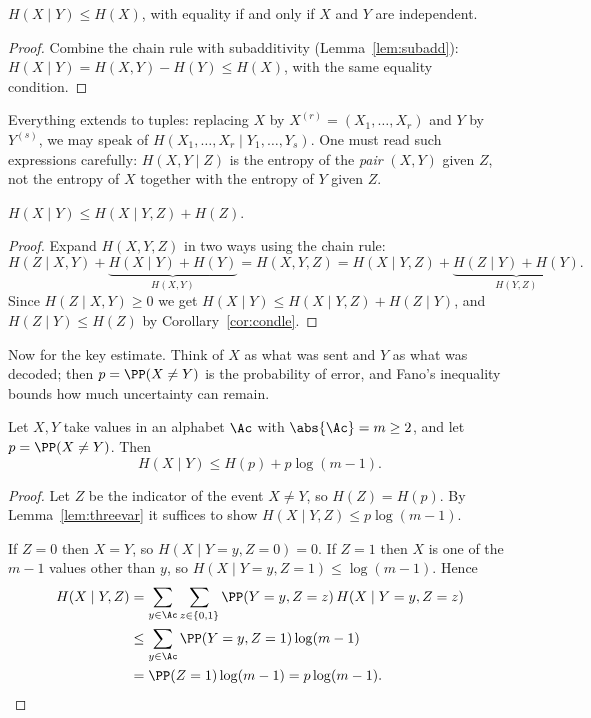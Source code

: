 \begin{corollary}\label{cor:condle}
	$H(X\mid Y)\le H(X)$, with equality if and only if $X$ and $Y$ are independent.
\end{corollary}

\begin{proof}
	Combine the chain rule with subadditivity (Lemma~\ref{lem:subadd}): $H(X\mid Y) = H(X,Y)-H(Y) \le H(X)$, with the same equality condition.
\end{proof}

Everything extends to tuples: replacing $X$ by $X^{(r)} = (X_1,\dots,X_r)$ and $Y$ by $Y^{(s)}$, we may speak of $H(X_1,\dots,X_r\mid Y_1,\dots,Y_s)$. One must read such expressions carefully: $H(X,Y\mid Z)$ is the entropy of the \emph{pair} $(X,Y)$ given $Z$, not the entropy of $X$ together with the entropy of $Y$ given $Z$.

\begin{lemma}\label{lem:threevar}
	$H(X\mid Y) \le H(X\mid Y,Z) + H(Z)$.
\end{lemma}

\begin{proof}
	Expand $H(X,Y,Z)$ in two ways using the chain rule:
	$$H(Z\mid X,Y) + \underbrace{H(X\mid Y)+H(Y)}_{H(X,Y)} = H(X,Y,Z) = H(X\mid Y,Z)+\underbrace{H(Z\mid Y)+H(Y)}_{H(Y,Z)}.$$
	Since $H(Z\mid X,Y)\ge0$ we get $H(X\mid Y) \le H(X\mid Y,Z)+H(Z\mid Y)$, and $H(Z\mid Y)\le H(Z)$ by Corollary~\ref{cor:condle}.
\end{proof}

Now for the key estimate. Think of $X$ as what was sent and $Y$ as what was decoded; then $p = \PP(X\ne Y)$ is the probability of error, and Fano's inequality bounds how much uncertainty can remain.

\begin{proposition}\label{prop:fano}
	Let $X,Y$ take values in an alphabet $\Ac$ with $\abs{\Ac} = m \ge 2$, and let $p = \PP(X\ne Y)$. Then
	$$H(X\mid Y) \le H(p) + p\log(m-1).$$
\end{proposition}

\begin{proof}
	Let $Z$ be the indicator of the event $X \ne Y$, so $H(Z) = H(p)$. By Lemma~\ref{lem:threevar} it suffices to show $H(X\mid Y,Z)\le p\log(m-1)$.

	If $Z = 0$ then $X = Y$, so $H(X\mid Y=y,Z=0) = 0$. If $Z=1$ then $X$ is one of the $m-1$ values other than $y$, so $H(X\mid Y=y,Z=1)\le\log(m-1)$. Hence
	\begin{align*}
		H(X\mid Y,Z) &= \sum_{y\in\Ac}\sum_{z\in\{0,1\}}\PP(Y=y,Z=z)\,H(X\mid Y=y,Z=z)\\
		&\le \sum_{y\in\Ac}\PP(Y=y,Z=1)\log(m-1)\\
		&= \PP(Z=1)\log(m-1) = p\log(m-1). \qedhere
	\end{align*}
\end{proof}

